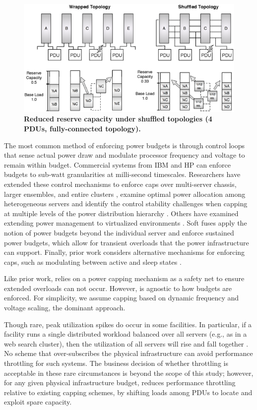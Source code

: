 \begin{figure}[t]
\centering
\includegraphics[width = 6.0 in]{Appendices/PowerRouting/figure/failover2.eps}
\caption{ \textbf{Reduced reserve capacity under shuffled topologies (4 PDUs, fully-connected topology).}}
\label{figure::failover}
\vspace{-.1 in}
\end{figure}

The most common method of enforcing power budgets is through control loops that sense actual power draw and modulate processor frequency and voltage to remain within budget.  Commercial systems from IBM \cite{Popa06} and HP \cite{HP09} can enforce budgets to sub-watt granularities at milli-second timescales.  Researchers have extended these control mechanisms to enforce caps over multi-server chassis, larger ensembles, and entire clusters \cite{Ranganathan06,Lefurgy08,Wang08, Femal05}, examine optimal power allocation among heterogeneous servers \cite{Gandhi09b} and identify the control stability challenges when capping at multiple levels of the power distribution hierarchy \cite{Raghavendra08,Wang09}. Others have examined extending power management to virtualized environments \cite{Nathuji07}.  Soft fuses \cite{Govindan09} apply the notion of power budgets beyond the individual server and enforce sustained power budgets, which allow for transient overloads that the power infrastructure can support.  Finally, prior work considers alternative mechanisms for enforcing caps, such as modulating between active and sleep states \cite{Gandhi09a}. 

Like prior work, \PowerRouting relies on a power capping mechanism as a safety net to ensure extended overloads can not occur.  However, \PowerRouting is agnostic to how budgets are enforced. For simplicity, we assume capping based on dynamic frequency and voltage scaling, the dominant approach.  

Though rare, peak utilization spikes do occur in some facilities.  In particular, if a facility runs a single distributed workload balanced over all servers (e.g., as in a web search cluster), then the utilization of all servers will rise and fall together \cite{Fan07}.  No scheme that over-subscribes the physical infrastructure can avoid performance throttling for such systems. The business decision of whether throttling is acceptable in these rare circumstances is beyond the scope of this study; however, for any given physical infrastructure budget, \PowerRouting reduces performance throttling relative to existing capping schemes, by shifting loads among PDUs to locate and exploit spare capacity.

